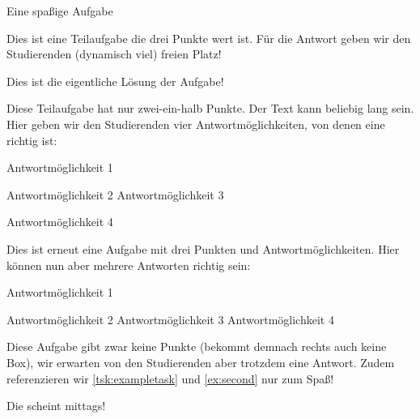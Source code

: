 \begin{Exercise}{Eine spaßige Aufgabe}
\begin{tasks}
    Dies ist eine Teilaufgabe die drei Punkte wert ist. Für die Antwort geben wir den Studierenden (dynamisch viel) freien Platz!
   \VerticalSpace
\begin{solution}
   Dies ist die eigentliche Lösung der Aufgabe!
\end{solution}
    \label{tsk:exampletask}Diese Teilaufgabe hat nur zwei-ein-halb Punkte. Der Text kann beliebig lang sein. Hier geben wir den Studierenden vier Antwortmöglichkeiten, von denen eine richtig ist:
   \begin{radioboxes}
      \item    Antwortmöglichkeit 1
      \item    Antwortmöglichkeit 2
      \correct Antwortmöglichkeit 3
      \item    Antwortmöglichkeit 4
   \end{radioboxes}
    Dies ist erneut eine Aufgabe mit drei Punkten und Antwortmöglichkeiten. Hier können nun aber mehrere Antworten richtig sein:
   \begin{checkboxes}
      \correct Antwortmöglichkeit 1
      \item    Antwortmöglichkeit 2
      \correct Antwortmöglichkeit 3
      \correct Antwortmöglichkeit 4
   \end{checkboxes}
    Diese Aufgabe gibt zwar keine Punkte (bekommt demnach rechts auch keine Box), wir erwarten von den Studierenden aber trotzdem eine Antwort. Zudem referenzieren wir \autoref{tsk:exampletask} und \autoref{ex:second} nur zum Spaß!

   Die  scheint mittags!
   \qquad\strut
\end{tasks}
\end{Exercise}